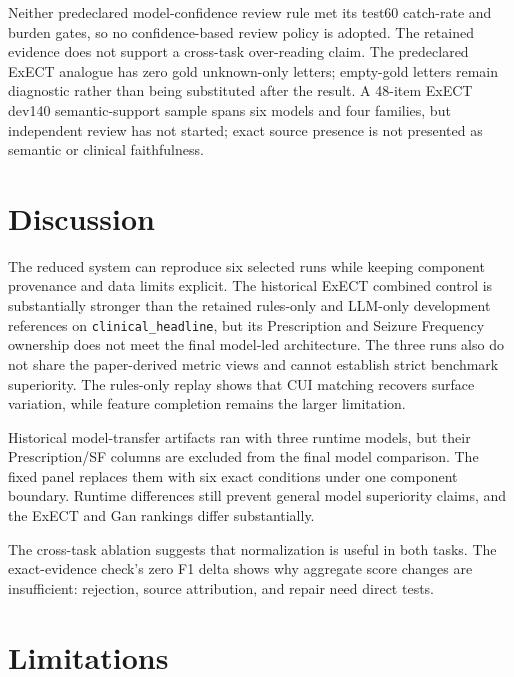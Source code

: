 \documentclass[conference]{IEEEtran}
\newcommand{\code}[1]{\texttt{#1}}
\begin{document}
Neither predeclared model-confidence review rule met its test60 catch-rate and
burden gates, so no confidence-based review policy is adopted. The retained
evidence does not support a cross-task over-reading claim. The predeclared
ExECT analogue has zero gold unknown-only letters; empty-gold letters remain
diagnostic rather than being substituted after the result. A 48-item ExECT
dev140 semantic-support sample spans six models and four families, but
independent review has not started; exact source presence is not presented as
semantic or clinical faithfulness.

\section{Discussion}

The reduced system can reproduce six selected runs while keeping component
provenance and data limits explicit. The historical ExECT combined control is
substantially stronger than the retained rules-only and LLM-only development
references on \code{clinical\_headline}, but its Prescription and Seizure
Frequency ownership does not meet the final model-led architecture. The three
runs also do not share the paper-derived metric views and cannot establish
strict benchmark superiority. The rules-only
replay shows that CUI matching recovers surface variation, while feature
completion remains the larger limitation.

Historical model-transfer artifacts ran with three runtime models, but their
Prescription/SF columns are excluded from the final model comparison. The
fixed panel replaces them with six exact conditions under one component
boundary. Runtime differences still prevent general model superiority claims,
and the ExECT and Gan rankings differ substantially.

The cross-task ablation suggests that normalization is useful in both tasks.
The exact-evidence check's zero F1 delta shows why aggregate score changes are
insufficient: rejection, source attribution, and repair need direct tests.

\section{Limitations}
\end{document}
